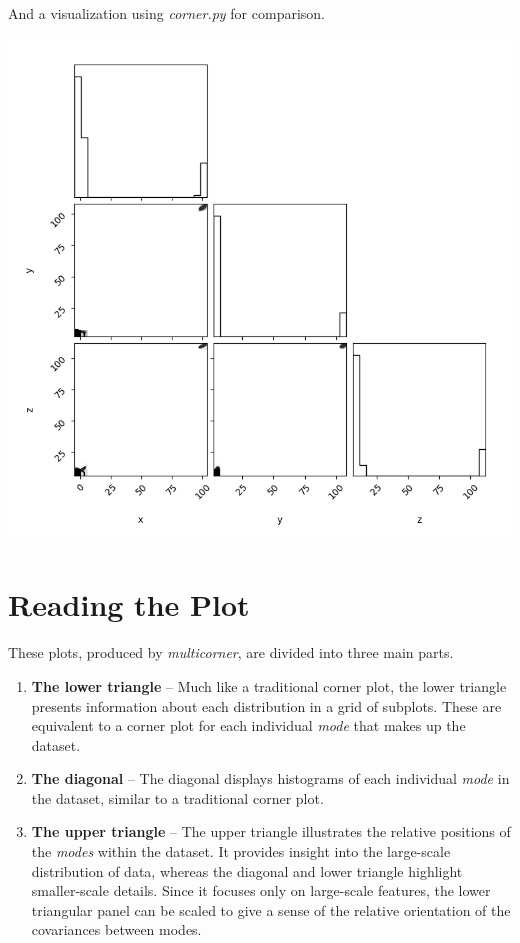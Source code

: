\documentclass[]{article}
\begin{document}
And a visualization using \emph{corner.py} for comparison.

\includegraphics[width=1.0\textwidth]{cornerplot.png}


\section{Reading the Plot}\label{reading_the_plot}

These plots, produced by \emph{multicorner}, are divided into three main parts.

\begin{enumerate}
    \item \textbf{The lower triangle} – Much like a traditional corner plot, the lower triangle presents information about each distribution in a grid of subplots. These are equivalent to a corner plot for each individual \textit{mode} that makes up the dataset.

    \item \textbf{The diagonal} – The diagonal displays histograms of each individual \textit{mode} in the dataset, similar to a traditional corner plot.

    \item \textbf{The upper triangle} – The upper triangle illustrates the relative positions of the \textit{modes} within the dataset. It provides insight into the large-scale distribution of data, whereas the diagonal and lower triangle highlight smaller-scale details. Since it focuses only on large-scale features, the lower triangular panel can be scaled to give a sense of the relative orientation of the covariances between modes.
\end{enumerate}

  

\end{document}
